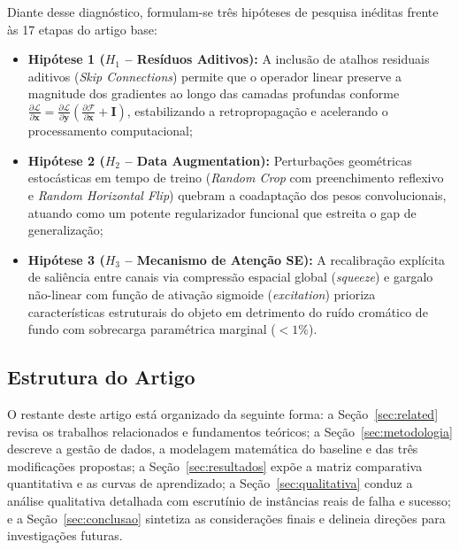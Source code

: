 \documentclass[runningheads]{llncs}
\begin{document}
Diante desse diagn\'{o}stico, formulam-se tr\^{e}s hip\'{o}teses de pesquisa in\'{e}ditas frente \`{a}s 17 etapas do artigo base:
\begin{itemize}
    \item \textbf{Hip\'{o}tese 1 ($H_1$ -- Res\'{i}duos Aditivos):} A inclus\~{a}o de atalhos residuais aditivos (\textit{Skip Connections}) permite que o operador linear preserve a magnitude dos gradientes ao longo das camadas profundas conforme $\frac{\partial \mathcal{L}}{\partial \mathbf{x}} = \frac{\partial \mathcal{L}}{\partial \mathbf{y}} (\frac{\partial \mathcal{F}}{\partial \mathbf{x}} + \mathbf{I})$, estabilizando a retropropaga\c{c}\~{a}o e acelerando o processamento computacional;
    \item \textbf{Hip\'{o}tese 2 ($H_2$ -- Data Augmentation):} Perturba\c{c}\~{o}es geom\'{e}tricas estoc\'{a}sticas em tempo de treino (\textit{Random Crop} com preenchimento reflexivo e \textit{Random Horizontal Flip}) quebram a coadapta\c{c}\~{a}o dos pesos convolucionais, atuando como um potente regularizador funcional que estreita o gap de generaliza\c{c}\~{a}o;
    \item \textbf{Hip\'{o}tese 3 ($H_3$ -- Mecanismo de Aten\c{c}\~{a}o SE):} A recalibra\c{c}\~{a}o expl\'{i}cita de sali\^{e}ncia entre canais via compress\~{a}o espacial global (\textit{squeeze}) e gargalo n\~{a}o-linear com fun\c{c}\~{a}o de ativa\c{c}\~{a}o sigmoide (\textit{excitation}) prioriza caracter\'{i}sticas estruturais do objeto em detrimento do ru\'{i}do crom\'{a}tico de fundo com sobrecarga param\'{e}trica marginal ($< 1\%$).
\end{itemize}

\subsection{Estrutura do Artigo}
O restante deste artigo est\'{a} organizado da seguinte forma: a Se\c{c}\~{a}o~\ref{sec:related} revisa os trabalhos relacionados e fundamentos te\'{o}ricos; a Se\c{c}\~{a}o~\ref{sec:metodologia} descreve a gest\~{a}o de dados, a modelagem matem\'{a}tica do baseline e das tr\^{e}s modifica\c{c}\~{o}es propostas; a Se\c{c}\~{a}o~\ref{sec:resultados} exp\~{o}e a matriz comparativa quantitativa e as curvas de aprendizado; a Se\c{c}\~{a}o~\ref{sec:qualitativa} conduz a an\'{a}lise qualitativa detalhada com escrut\'{i}nio de inst\^{a}ncias reais de falha e sucesso; e a Se\c{c}\~{a}o~\ref{sec:conclusao} sintetiza as considera\c{c}\~{o}es finais e delineia dire\c{c}\~{o}es para investiga\c{c}\~{o}es futuras.
\end{document}
